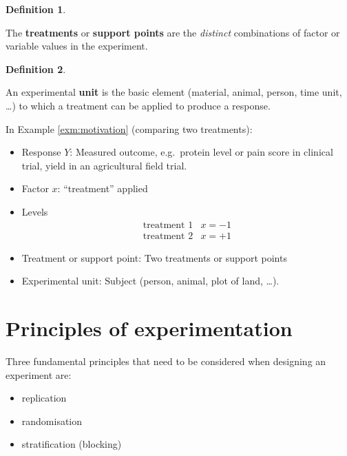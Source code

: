 \documentclass[
]{book}
\providecommand{\tightlist}{%
  \setlength{\itemsep}{0pt}\setlength{\parskip}{0pt}}
\theoremstyle{definition}
\newtheorem{definition}{Definition}[chapter]
\theoremstyle{definition}
\theoremstyle{definition}
\theoremstyle{definition}
\theoremstyle{remark}
\begin{document}
\begin{definition}
\protect\hypertarget{def:treatment}{}\label{def:treatment}

The \textbf{treatments} or \textbf{support points} are the \emph{distinct} combinations of factor or variable values in the experiment.

\end{definition}

\begin{definition}
\protect\hypertarget{def:unit}{}\label{def:unit}

An experimental \textbf{unit} is the basic element (material, animal, person, time unit, \ldots) to which a treatment can be applied to produce a response.

\end{definition}

In Example \ref{exm:motivation} (comparing two treatments):

\begin{itemize}
\tightlist
\item
  Response \(Y\): Measured outcome, e.g.~protein level or pain score in clinical trial, yield in an agricultural field trial.
\item
  Factor \(x\): ``treatment'' applied
\item
  Levels
  \[
  \begin{array}{ll}
  \textrm{treatment 1}&x =-1\\
  \textrm{treatment 2}&x =+1
  \end{array}
  \]
\item
  Treatment or support point: Two treatments or support points
\item
  Experimental unit: Subject (person, animal, plot of land, \ldots).
\end{itemize}

\hypertarget{principles}{%
\section{Principles of experimentation}\label{principles}}

Three fundamental principles that need to be considered when designing an experiment are:

\begin{itemize}
\tightlist
\item
  replication
\item
  randomisation
\item
  stratification (blocking)
\end{itemize}
\end{document}
